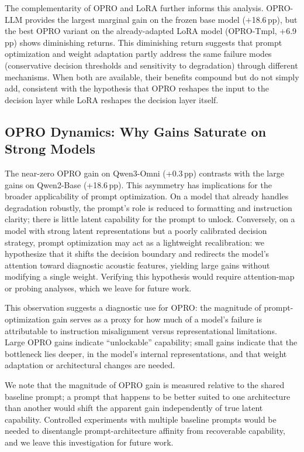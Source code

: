 \documentclass[11pt,a4paper]{article}
\begin{document}
The complementarity of OPRO and LoRA further informs this analysis. OPRO-LLM provides the largest marginal gain on the frozen base model (+18.6\,pp), but the best OPRO variant on the already-adapted LoRA model (OPRO-Tmpl, +6.9\,pp) shows diminishing returns. This diminishing return suggests that prompt optimization and weight adaptation partly address the same failure modes (conservative decision thresholds and sensitivity to degradation) through different mechanisms. When both are available, their benefits compound but do not simply add, consistent with the hypothesis that OPRO reshapes the input to the decision layer while LoRA reshapes the decision layer itself.

\subsection{OPRO Dynamics: Why Gains Saturate on Strong Models}
\label{subsec:disc_opro_saturation}

The near-zero OPRO gain on Qwen3-Omni (+0.3\,pp) contrasts with the large gains on Qwen2-Base (+18.6\,pp). This asymmetry has implications for the broader applicability of prompt optimization. On a model that already handles degradation robustly, the prompt's role is reduced to formatting and instruction clarity; there is little latent capability for the prompt to unlock. Conversely, on a model with strong latent representations but a poorly calibrated decision strategy, prompt optimization may act as a lightweight recalibration: we hypothesize that it shifts the decision boundary and redirects the model's attention toward diagnostic acoustic features, yielding large gains without modifying a single weight. Verifying this hypothesis would require attention-map or probing analyses, which we leave for future work.

This observation suggests a diagnostic use for OPRO: the magnitude of prompt-optimization gain serves as a proxy for how much of a model's failure is attributable to instruction misalignment versus representational limitations. Large OPRO gains indicate ``unlockable'' capability; small gains indicate that the bottleneck lies deeper, in the model's internal representations, and that weight adaptation or architectural changes are needed.

We note that the magnitude of OPRO gain is measured relative to the shared baseline prompt;
a prompt that happens to be better suited to one architecture than another would shift the
apparent gain independently of true latent capability. Controlled experiments with multiple
baseline prompts would be needed to disentangle prompt-architecture affinity from recoverable
capability, and we leave this investigation for future work.
\end{document}
